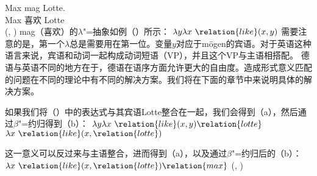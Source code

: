 \gll Max mag Lotte.\\
     Max 喜欢 Lotte\\
\ex {}(, )
\zl
mag（喜欢）的$\lambda$"=抽象如例（）所示：
\ea
$\lambda y \lambda x~\relation{like}(x, y)$
\z
需要注意的是，第一个$\lambda$总是需要用在第一位。变量$y$对应于mögen的宾语。对于英语这种语言来说，宾语和动词一起构成动词短语（VP），并且这个VP与主语相搭配。
德语与英语不同的地方在于，德语在语序方面允许更大的自由度。造成形式意义匹配的问题在不同的理论中有不同的解决方案。我们将在下面的章节中来说明具体的解决方案。

如果我们将（）中的表达式与其宾语Lotte整合在一起，我们会得到（a），然后通过$\beta$"=约归得到（b）：
\eal
\label{lambda-moegen}
\ex $\lambda y \lambda x~\relation{like}(x, y) \relation{lotte}$
\ex $\lambda x~\relation{like}(x, \relation{lotte})$
\zl

\noindent
这一意义可以反过来与主语整合，进而得到（a），以及通过$\beta$"=约归后的（b）：
\eal
\ex $\lambda x~\relation{like}(x, \relation{lotte}) \relation{max}$
\ex {}(, )
\zl

